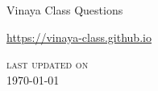 \frontmatter

{\centering%

{\LARGE Vinaya Class Questions}

\href{https://vinaya-class.github.io}{https://vinaya-class.github.io}

{\scshape\small last updated on}\\
\today

}

\tableofcontents*

\mainmatter

%
%
%
%
%
%
%
%
%
%
%

%
%
%

%
%
%
%
%
%
%
%
%
%
%
%



